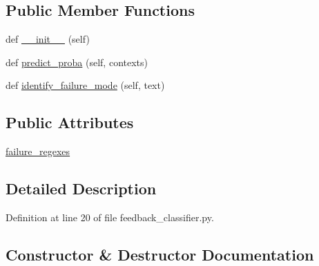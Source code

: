\subsection*{Public Member Functions}
\begin{DoxyCompactItemize}
\item 
def \hyperlink{classself__feeding_1_1feedback__classifier_1_1feedback__classifier_1_1FeedbackClassifierRegex_a9752ea035255a17f9a36a3c6a3909eca}{\+\_\+\+\_\+init\+\_\+\+\_\+} (self)
\item 
def \hyperlink{classself__feeding_1_1feedback__classifier_1_1feedback__classifier_1_1FeedbackClassifierRegex_a556ca2e477a4c21107241fbde7f2f8ab}{predict\+\_\+proba} (self, contexts)
\item 
def \hyperlink{classself__feeding_1_1feedback__classifier_1_1feedback__classifier_1_1FeedbackClassifierRegex_a53f9a6c99688e0da9304aefb5148d508}{identify\+\_\+failure\+\_\+mode} (self, text)
\end{DoxyCompactItemize}
\subsection*{Public Attributes}
\begin{DoxyCompactItemize}
\item 
\hyperlink{classself__feeding_1_1feedback__classifier_1_1feedback__classifier_1_1FeedbackClassifierRegex_ac94df17ef727444efbe54c47c455de9c}{failure\+\_\+regexes}
\end{DoxyCompactItemize}


\subsection{Detailed Description}


Definition at line 20 of file feedback\+\_\+classifier.\+py.



\subsection{Constructor \& Destructor Documentation}
\mbox{\label{classself__feeding_1_1feedback__classifier_1_1feedback__classifier_1_1FeedbackClassifierRegex_a9752ea035255a17f9a36a3c6a3909eca}} 
